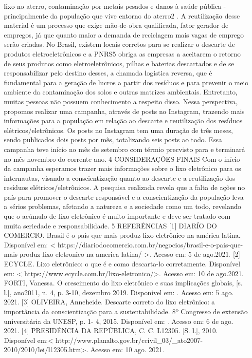 lixo no aterro, contaminação por metais pesados e danos à saúde pública - principalmente da 
população que vive entorno do aterro2
. A reutilização desse material é um processo que exige
mão-de-obra qualificada, fator gerador de empregos, já que quanto maior a demanda de 
reciclagem mais vagas de emprego serão criadas.
No Brasil, existem locais corretos para se realizar o descarte de produtos eletroeletrônicos
e a PNRS5
obriga as empresas a aceitarem o retorno de seus produtos como eletroeletrônicos,
pilhas e baterias descartados e de se responsabilizar pelo destino desses, a chamada logística
reversa, que é fundamental para a geração de lucros a partir dos resíduos e para prevenir o meio
ambiente da contaminação dos solos e outras matrizes ambientais. Entretanto, muitas pessoas não
possuem conhecimento a respeito disso.
Nessa perspectiva, propomos realizar uma campanha, através de posts no Instagram,
trazendo mais informações para a população em relação ao descarte e reutilização dos resíduos 
elétricos/eletrônicos. Os posts no Instagram tem uma duração de três meses, sendo publicados 
dois posts por mês, totalizando seis posts ao todo. Essa campanha teve início no mês de setembro
com térmio precvisto para e terminará no mês novembro do corrente ano.
4 CONSIDERAÇÕES FINAIS
Com o início da campanha esperamos trazer mais informações sobre o lixo eletrônico para
os internautas, visando a conscientização quanto ao descarte e a reutilização dos resíduos
elétricos/eletrônicos. A pesquisa realizada revela que a falta de ações no país para promover o
descarte responsável e a conscientização da população leva a sérios problemas, afetando a natureza
e a sociedade como um todo, revelando que o acúmulo de lixo eletrônico é muito importante e
deve ser tratado com muita seriedade e responsabilidade.
5 REFERÊNCIAS
[1] DIARÍO DO COMERCIO. Brasil é o país que mais produz lixo eletrônico na américa
latina. Disponível em: < https://diariodocomercio.com.br/negocios/brasil-e-o-pais-que-maisproduz-lixo-eletronico-na-america-latina/ >. Acesso em: 5 de ago.2021.
[2] ECYCLE. Lixo eletrônico: o que é e como descarta-lo corretamente. Disponível em: <
https://www.ecycle.com.br/lixo-eletronico/>. Acesso em: 10 de ago.2021.
FORTI, Vanessa. O crescimento do lixo eletrônico e suas implicações globais, [s. l.], ano2011,
n. 4, p. 3-10, dezembro 2019. Disponível em: .
Acesso em: 5 ago. 2021.
[3] OLIVEIRA, Anneheide. Descarte correto do lixo eletrônico: a importância da
conscientização para a sustentabilidade. 8º Congresso de extensão universitária da UNESP, p. 1-
4, 2015. Disponível em: . Acesso em: 6 de ago. 2021.
[4] PRESIDÊNCIA DA REPÚBLICA, C. C. L12305. [S. l.], 2010. Disponível em:<
http://www.planalto.gov.br/ccivil_03/_ato2007-2010/2010/lei/l12305.htm>. Acesso em: 10 ago.
2021.

